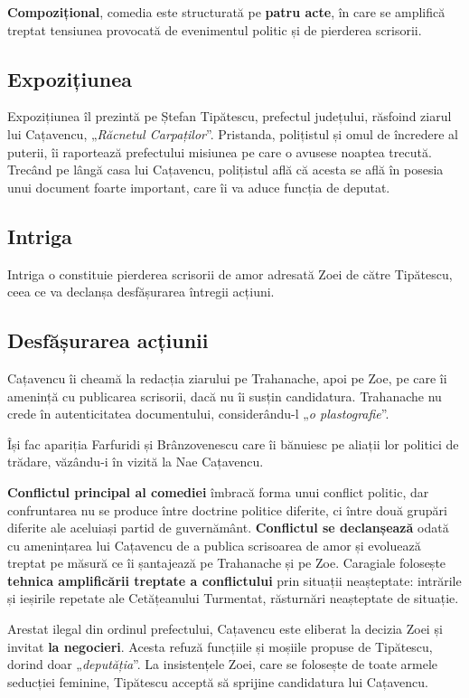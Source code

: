 \documentclass{article}
\newcommand{\qu}[1]{„\emph{#1}”}
\begin{document}
\textbf{Compozițional}, comedia este structurată pe \textbf{patru acte}, în care se amplifică treptat tensiunea provocată de evenimentul politic și de pierderea scrisorii.
\subsection{Expozițiunea}
Expozițiunea îl prezintă pe Ștefan Tipătescu, prefectul județului, răsfoind ziarul lui Cațavencu, \qu{Răcnetul Carpaților}. Pristanda, polițistul și omul de încredere al puterii, îi raportează prefectului misiunea pe care o avusese noaptea trecută. Trecând pe lângă casa lui Cațavencu, polițistul află că acesta se află în posesia unui document foarte important, care îi va aduce funcția de deputat.
\subsection{Intriga}
Intriga o constituie pierderea scrisorii de amor adresată Zoei de către Tipătescu, ceea ce va declanșa desfășurarea întregii acțiuni.
\subsection{Desfășurarea acțiunii}
Cațavencu îi cheamă la redacția ziarului pe Trahanache, apoi pe Zoe, pe care îi amenință cu publicarea scrisorii, dacă nu îi susțin candidatura. Trahanache nu crede în autenticitatea documentului, considerându-l \qu{o plastografie}.

Își fac apariția Farfuridi și Brânzovenescu care îi bănuiesc pe aliații lor politici de trădare, văzându-i în vizită la Nae Cațavencu.

\textbf{Conflictul principal al comediei} îmbracă forma unui conflict politic, dar confruntarea nu se produce între doctrine politice diferite, ci între două grupări diferite ale aceluiași partid de guvernământ. \textbf{Conflictul se declanșează} odată cu amenințarea lui Cațavencu de a publica scrisoarea de amor și evoluează treptat pe măsură ce îi șantajează pe Trahanache și pe Zoe. Caragiale folosește \textbf{tehnica amplificării treptate a conflictului} prin situații neașteptate: intrările și ieșirile repetate ale Cetățeanului Turmentat, răsturnări neașteptate de situație.

Arestat ilegal din ordinul prefectului, Cațavencu este eliberat la decizia Zoei și invitat \textbf{la negocieri}. Acesta refuză funcțiile și moșiile propuse de Tipătescu, dorind doar \qu{deputăția}. La insistențele Zoei, care se folosește de toate armele seducției feminine, Tipătescu acceptă să sprijine candidatura lui Cațavencu.
\end{document}
